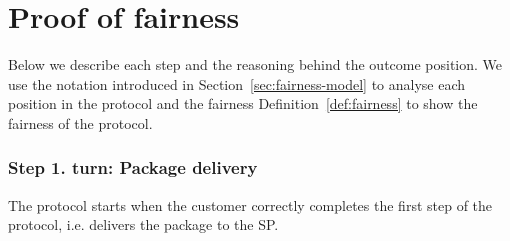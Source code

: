 \documentclass[pdftex,twocolumn,epjc3]{svjour3}
\renewcommand{\sp}{SP}
\begin{document}
\begin{sloppypar}
\section{Proof of fairness}\label{app:proof-of-fairness}
Below we describe each step and the reasoning behind the outcome position.
We use the notation introduced in Section~\ref{sec:fairness-model} to analyse each position in the protocol and the fairness Definition~\ref{def:fairness} to show the fairness of the protocol.

\newcommand{\AgreeablePath}{Agreeable path:}
\newcommand{\DisputePath}{The customer starts a dispute:}
\newcommand{\Fairness}{Fairness:}
\newcommand{\CustomerTurn}[0]{\expandafter\MakeUppercase customer turn:}
\newcommand{\SPTurn}[0]{\sp{} turn:}

\newcommand{\CanFollowToOne}[2]{The #1 can follow the protocol to the non-disadvantaged position #2}
\newcommand{\CanDoNothing}[1]{The #1 can do nothing and always ends up in the non-disadvantaged position}
\newcommand{\CanDoAnything}[1]{The #1 can do anything and always ends up in the non-disadvantaged position}
\newcommand{\Pos}[4]{$\operatorname{\sigma_{#1, #2, #3} = #4}$}
\newcommand{\WinForTheSameReason}[1]{The #1 wins the dispute for the same reason}
\newcommand{\LoseForTheSameReason}[1]{The #1 loses the dispute for the same reason}
\newcommand{\ActedAbnormallyThen}[1]{The #1 acted abnormally, then:}
\newcommand{\CustomerPaidButDidntGetResult}{The customer ends up in a disadvantageous position, because he has paid in advance, but hasn't received the result}
\newcommand{\SpReceivedThePayment}{The SP ends up in the advantageous position, having received the payment}

\newcommand{\CustomerLosesBeforePayment}{The customer loses the dispute because the SP is not obliged to do anything until the transaction is paid}
\newcommand{\CustomerLosesBeforePoP}{The customer loses the dispute because the SP is still able to publish the PoP within the agreed timeframe}

\newcommand{\RemainsIn}[2]{The #1 remains in the #2 position}

\subsubsection*{Step 1. \CustomerTurn{} Package delivery}\label{step-1-deliver-package}

The protocol starts when the customer correctly completes the first step of the protocol, i.e. delivers the package to the SP. 


\end{sloppypar}
\end{document}
